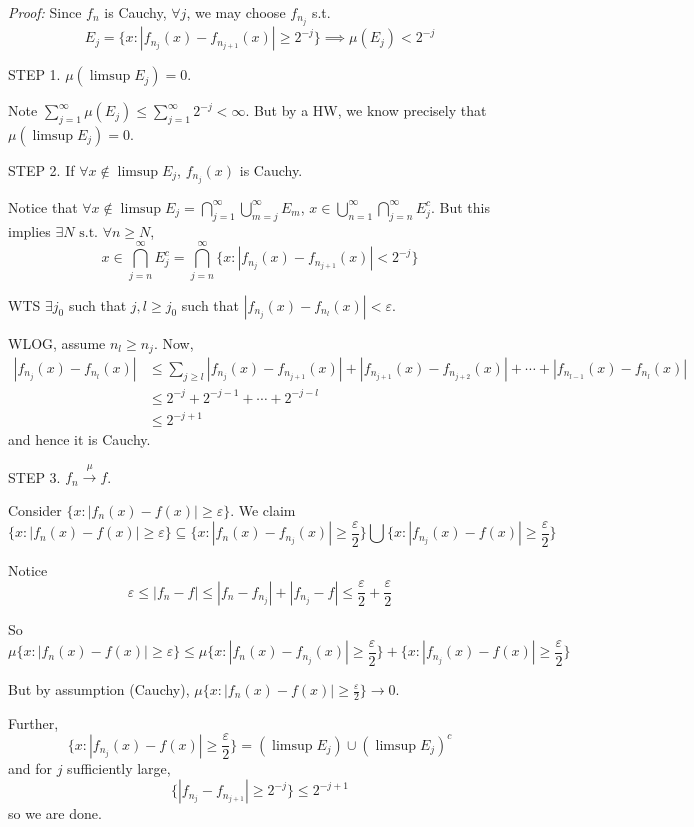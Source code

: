 \documentclass[12pt]{report}
\newcommand{\abs}[1]{\left\vert #1 \right\vert}
\newcommand{\ep}{\varepsilon}
\newcommand{\sub}{\subseteq}
\newcommand{\st}{\text{ s.t. }}
\newenvironment*{tbox}[2][gray]{
    \begin{tcolorbox}[
        parbox=false,
        colback=#1!5!white,
        colframe=#1!75!black,
        breakable,
        title={#2}
    ]}
    {\end{tcolorbox}}
\begin{document}
        \begin{tbox}{\textbf{Theorem:} Assume $f_n$ is Cauchy w.r.t convergence in measure. Then $\exists f$ measurable and $f_{n_j}$ a subsequence such that $f_{n_j} \to f$ a.e. and $f_n \overset{\mu}{\longrightarrow} f$}
            \emph{Proof:} Since $f_n$ is Cauchy, $\forall j$, we may choose $f_{n_j}$ s.t. 
            \[E_j = \{x: \abs{f_{n_j}(x) - f_{n_{j+1}}(x)} \geq 2^{-j}\} \implies \mu(E_j) < 2^{-j}\]

            STEP 1. $\mu(\limsup E_j) = 0$. 

            Note $\sum_{j=1}^\infty \mu(E_j) \leq \sum_{j=1}^\infty 2^{-j} < \infty$. But by a HW, we know precisely that $\mu(\limsup E_j) = 0$.

            STEP 2. If $\forall x \notin \limsup E_j$, $f_{n_j}(x)$ is Cauchy.

            Notice that $\forall x \notin \limsup E_j = \bigcap_{j=1}^\infty \bigcup_{m=j}^\infty E_m$, $x \in \bigcup_{n=1}^\infty \bigcap_{j=n}^\infty E_j^c$. But this implies $\exists N \st \forall n \geq N$,
            \[x \in \bigcap_{j = n}^\infty E_j^c = \bigcap_{j = n}^\infty \{x: \abs{f_{n_j}(x) - f_{n_{j+1}}(x)} < 2^{-j}\}\]

            WTS $\exists j_0$ such that $j, l \geq j_0$ such that $\abs{f_{n_j}(x) - f_{n_l}(x)} < \ep$.

            WLOG, assume $n_l \geq n_j$. Now,
            \begin{align*}
                \abs{f_{n_j}(x) - f_{n_l}(x)} &\leq \sum_{j \geq l} \abs{f_{n_j}(x) - f_{n_{j+1}}(x)} + \abs{f_{n_{j+1}}(x) - f_{n_{j+2}}(x)} + \cdots + \abs{f_{n_{l-1}}(x) - f_{n_l}(x)}\\ 
                & \leq 2^{-j} + 2^{-j-1} + \cdots + 2^{-j-l}\\ 
                &\leq 2^{-j + 1}\
            \end{align*}
            and hence it is Cauchy. 

            STEP 3. $f_n \overset{\mu}{\longrightarrow} f$.

            Consider $\{x: \abs{f_n(x) - f(x)} \geq \ep\}$. We claim 
            \[\{x: \abs{f_n(x) - f(x)} \geq \ep\} \sub \{x: \abs{f_n(x) - f_{n_j}(x)} \geq \frac{\ep}{2}\} \bigcup \{x: \abs{f_{n_j}(x) - f(x)} \geq \frac{\ep}{2}\}\]
            
            Notice 
            \[\ep \leq \abs{f_n -f} \leq \abs{f_n - f_{n_j}} + \abs{f_{n_j} - f} \leq \frac{\ep}{2} + \frac{\ep}{2}\]

            So 
            \[\mu\{x: \abs{f_n(x) - f(x)} \geq \ep\} \leq \mu\{x: \abs{f_{n}(x) - f_{n_j}(x)} \geq \frac{\ep}{2}\} + \{x: \abs{f_{n_j}(x) - f(x)} \geq \frac{\ep}{2}\}\]

            But by assumption (Cauchy), $\mu\{x: \abs{f_n(x) - f(x)} \geq \frac{\ep}{2}\} \to 0$. 

            Further, 
            \[\{x: \abs{f_{n_j}(x) - f(x)} \geq \frac{\ep}{2}\} = (\limsup E_j) \cup (\limsup E_j)^c\]
            and for $j$ sufficiently large, 
            \[\{\abs{f_{n_j} - f_{n_{j+1}}} \geq 2^{-j}\} \leq 2^{-j + 1}\]
            so we are done. 
        \end{tbox}
\end{document}
